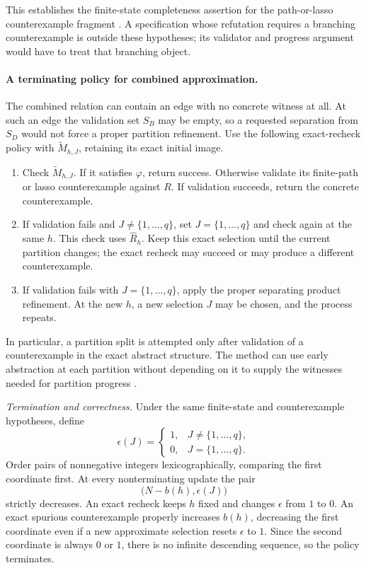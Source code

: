 This establishes the finite-state completeness assertion for the
path-or-lasso counterexample fragment
\cite[thm.~4.24]{ClarkeEtAl2003}. A specification whose refutation
requires a branching counterexample is outside these hypotheses; its
validator and progress argument would have to treat that branching
object.

\paragraph{A terminating policy for combined approximation.}
The combined relation can contain an edge with no concrete witness at all.
At such an edge the validation set \(S_B\) may be empty, so a requested
separation from \(S_D\) would not force a proper partition refinement.
Use the following exact-recheck policy with
\(\widetilde M_{h,J}\), retaining its exact initial image.
\begin{enumerate}
\item Check \(\widetilde M_{h,J}\). If it satisfies \(\varphi\),
return success. Otherwise validate its finite-path or lasso
counterexample against \(R\). If validation succeeds, return the
concrete counterexample.
\item If validation fails and \(J\ne\{1,\ldots,q\}\), set
\(J=\{1,\ldots,q\}\) and check again at the same \(h\).
This check uses \(\widehat R_h\). Keep this exact selection until
the current partition changes; the exact recheck may succeed or may
produce a different counterexample.
\item If validation fails with \(J=\{1,\ldots,q\}\), apply the proper
separating product refinement. At the new \(h\), a new selection \(J\)
may be chosen, and the process repeats.
\end{enumerate}
In particular, a partition split is attempted only after validation of
a counterexample in the exact abstract structure. The method can use
early abstraction at each partition without depending on it to supply
the witnesses needed for partition progress
\cite[\S6]{ClarkeEtAl2003}.

\emph{Termination and correctness.}
Under the same finite-state and counterexample hypotheses, define
\[
 \epsilon(J)=
 \begin{cases}
  1,&J\ne\{1,\ldots,q\},\\
  0,&J=\{1,\ldots,q\}.
 \end{cases}
\]
Order pairs of nonnegative integers lexicographically, comparing the
first coordinate first. At every nonterminating update the pair
\[
 \bigl(N-b(h),\epsilon(J)\bigr)
\]
strictly decreases. An exact recheck keeps \(h\) fixed and changes
\(\epsilon\) from \(1\) to \(0\). An exact spurious counterexample
properly increases \(b(h)\), decreasing the first coordinate even if a
new approximate selection resets \(\epsilon\) to \(1\). Since the
second coordinate is always \(0\) or \(1\), there is no infinite
descending sequence, so the policy terminates.

